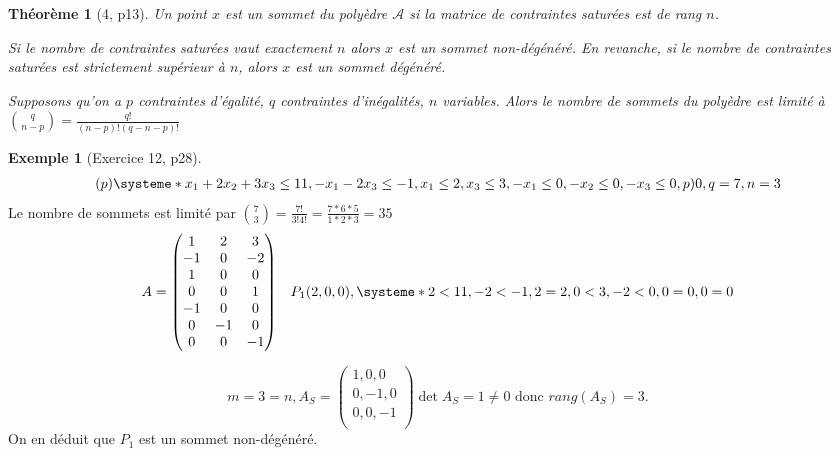 \documentclass{article}
\theoremstyle{plain}%
\newtheorem{thm}{Théorème}[section]
\theoremstyle{definition}
\newtheorem{exmp}{Exemple}[section]
\theoremstyle{remark}
\begin{document}
\begin{thm}[4, p13]
    Un point $ x $ est un sommet du polyèdre $ \mathcal{A} $ si la matrice de contraintes saturées est de rang $ n $.

    Si le nombre de contraintes saturées vaut exactement $ n $ alors $ x $ est un sommet non-dégénéré. En revanche, si le nombre de contraintes saturées est strictement supérieur à $ n $, alors $ x $ est un sommet dégénéré.

    Supposons qu'on a $ p $ contraintes d'égalité, $ q $ contraintes d'inégalités, $ n $ variables. Alors le nombre de sommets du polyèdre est limité à $ \binom{q}{n-p} = \frac{q!}{(n-p)!(q-n-p)!} $ 
\end{thm}

\begin{exmp}[Exercice 12, p28]
    \begin{align*}
        (p) \systeme*{
            x_1 + 2 x_2 + 3x_3 \leq 11,
            -x_1 - 2 x_3 \leq -1,
            x_1 \leq 2,
            x_3 \leq 3,
            -x_1 \leq 0,
            -x_2 \leq 0,
            -x_3 \leq 0
        }, p)0, q=7, n=3
    \end{align*}
    Le nombre de sommets est limité par $ \binom{7}{3} = \frac{7!}{3!4!} = \frac{7*6*5}{1*2*3} = 35 $ 
    \begin{align*}
        &A = \begin{pmatrix}
            1 & 2 & 3 \\
            -1 & 0 & -2 \\
            1 & 0 & 0 \\
            0 & 0 & 1 \\
            -1 & 0 & 0 \\
            0 & -1 & 0 \\
            0 & 0 & -1
        \end{pmatrix}
        &P_1(2,0,0), \systeme*{
            2 < 11,
            -2 < -1,
            2 = 2,
            0 < 3,
            -2 < 0,
            0=0,
            0=0
        }
    \end{align*}
    
    \[
        m=3=n, A_S = \begin{pmatrix}
            1,0,0 \\
            0,-1,0 \\
            0,0,-1 \\
        \end{pmatrix}
        \det A_S = 1 \neq 0 \text{ donc } rang(A_S) = 3
    .\]
    On en déduit que $ P_1 $ est un sommet non-dégénéré.


\end{exmp}
\end{document}
